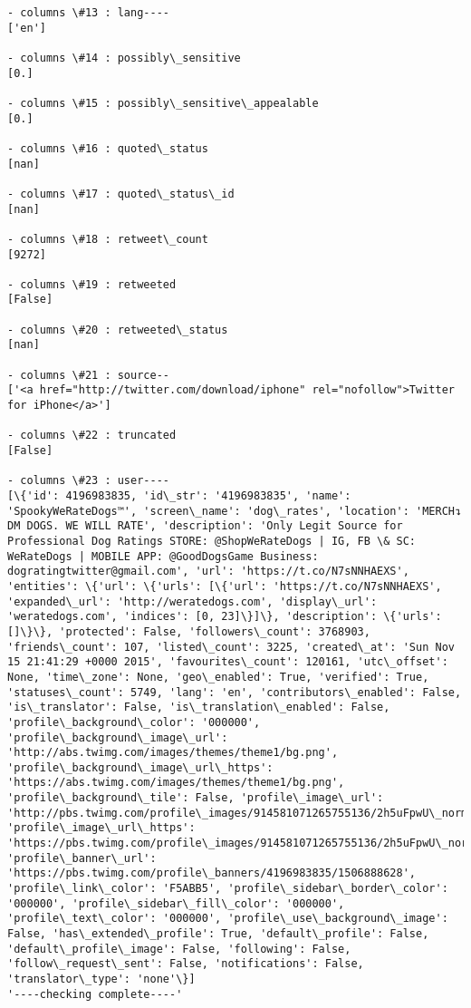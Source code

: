 \documentclass[11pt]{article}
\begin{document}
\begin{Verbatim}[commandchars=\\\{\}]
- columns \#13 : lang----
['en']

- columns \#14 : possibly\_sensitive
[0.]

- columns \#15 : possibly\_sensitive\_appealable
[0.]

- columns \#16 : quoted\_status
[nan]

- columns \#17 : quoted\_status\_id
[nan]

- columns \#18 : retweet\_count
[9272]

- columns \#19 : retweeted
[False]

- columns \#20 : retweeted\_status
[nan]

- columns \#21 : source--
['<a href="http://twitter.com/download/iphone" rel="nofollow">Twitter for iPhone</a>']

- columns \#22 : truncated
[False]

- columns \#23 : user----
[\{'id': 4196983835, 'id\_str': '4196983835', 'name': 'SpookyWeRateDogs™', 'screen\_name': 'dog\_rates', 'location': 'MERCH↴  DM DOGS. WE WILL RATE', 'description': 'Only Legit Source for Professional Dog Ratings STORE: @ShopWeRateDogs | IG, FB \& SC: WeRateDogs | MOBILE APP: @GoodDogsGame Business: dogratingtwitter@gmail.com', 'url': 'https://t.co/N7sNNHAEXS', 'entities': \{'url': \{'urls': [\{'url': 'https://t.co/N7sNNHAEXS', 'expanded\_url': 'http://weratedogs.com', 'display\_url': 'weratedogs.com', 'indices': [0, 23]\}]\}, 'description': \{'urls': []\}\}, 'protected': False, 'followers\_count': 3768903, 'friends\_count': 107, 'listed\_count': 3225, 'created\_at': 'Sun Nov 15 21:41:29 +0000 2015', 'favourites\_count': 120161, 'utc\_offset': None, 'time\_zone': None, 'geo\_enabled': True, 'verified': True, 'statuses\_count': 5749, 'lang': 'en', 'contributors\_enabled': False, 'is\_translator': False, 'is\_translation\_enabled': False, 'profile\_background\_color': '000000', 'profile\_background\_image\_url': 'http://abs.twimg.com/images/themes/theme1/bg.png', 'profile\_background\_image\_url\_https': 'https://abs.twimg.com/images/themes/theme1/bg.png', 'profile\_background\_tile': False, 'profile\_image\_url': 'http://pbs.twimg.com/profile\_images/914581071265755136/2h5uFpwU\_normal.jpg', 'profile\_image\_url\_https': 'https://pbs.twimg.com/profile\_images/914581071265755136/2h5uFpwU\_normal.jpg', 'profile\_banner\_url': 'https://pbs.twimg.com/profile\_banners/4196983835/1506888628', 'profile\_link\_color': 'F5ABB5', 'profile\_sidebar\_border\_color': '000000', 'profile\_sidebar\_fill\_color': '000000', 'profile\_text\_color': '000000', 'profile\_use\_background\_image': False, 'has\_extended\_profile': True, 'default\_profile': False, 'default\_profile\_image': False, 'following': False, 'follow\_request\_sent': False, 'notifications': False, 'translator\_type': 'none'\}]
'----checking complete----'

    \end{Verbatim}
\end{document}
